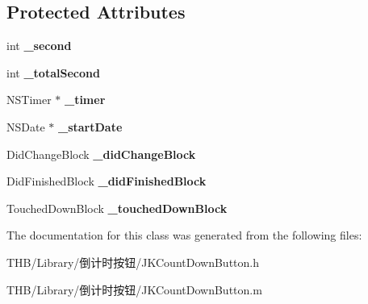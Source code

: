 \subsection*{Protected Attributes}
\begin{DoxyCompactItemize}
\item 
\mbox{\label{interface_j_k_count_down_button_ac7014a69a36839af9a22d300d0825749}} 
int {\bfseries \+\_\+second}
\item 
\mbox{\label{interface_j_k_count_down_button_acd15182ea6d2ea4c9079aed18d4be45a}} 
int {\bfseries \+\_\+total\+Second}
\item 
\mbox{\label{interface_j_k_count_down_button_abd8b8a2eb3876d17684b34e0fb43da85}} 
N\+S\+Timer $\ast$ {\bfseries \+\_\+timer}
\item 
\mbox{\label{interface_j_k_count_down_button_a08de2a903648d90a777814d8d897ee44}} 
N\+S\+Date $\ast$ {\bfseries \+\_\+start\+Date}
\item 
\mbox{\label{interface_j_k_count_down_button_a904a2b18ee3a15c59c7c3e71182d2089}} 
Did\+Change\+Block {\bfseries \+\_\+did\+Change\+Block}
\item 
\mbox{\label{interface_j_k_count_down_button_ab754ad828a67d4af6325dee465dbd102}} 
Did\+Finished\+Block {\bfseries \+\_\+did\+Finished\+Block}
\item 
\mbox{\label{interface_j_k_count_down_button_a628ab0864d80105077693e963914996e}} 
Touched\+Down\+Block {\bfseries \+\_\+touched\+Down\+Block}
\end{DoxyCompactItemize}


The documentation for this class was generated from the following files\+:\begin{DoxyCompactItemize}
\item 
T\+H\+B/\+Library/倒计时按钮/J\+K\+Count\+Down\+Button.\+h\item 
T\+H\+B/\+Library/倒计时按钮/J\+K\+Count\+Down\+Button.\+m\end{DoxyCompactItemize}
